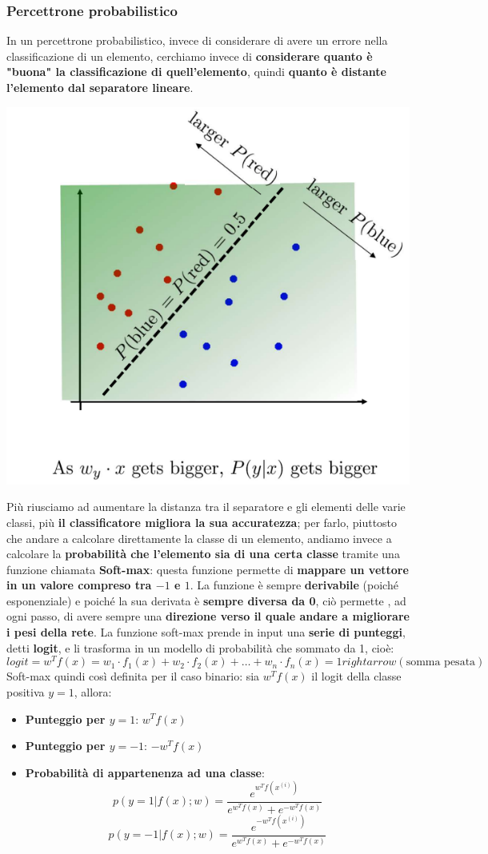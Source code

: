 \documentclass[12pt]{article}
\begin{document}
\subsubsection{Percettrone probabilistico}
In un percettrone probabilistico, invece di considerare di avere un errore nella classificazione di un elemento, cerchiamo invece di \textbf{considerare quanto è "buona" la classificazione di quell'elemento}, quindi \textbf{quanto è distante l'elemento dal separatore lineare}.
\begin{center}
    \includegraphics[width =0.50\linewidth]{Images/112.PNG}
\end{center}
Più riusciamo ad aumentare la distanza tra il separatore e gli elementi delle varie classi, più \textbf{il classificatore migliora la sua accuratezza};
per farlo, piuttosto che andare a calcolare direttamente la classe di un elemento, andiamo invece a calcolare la \textbf{probabilità che l'elemento sia di una certa classe} tramite una
funzione chiamata \textbf{Soft-max}: questa funzione permette di \textbf{mappare un vettore in un valore compreso tra $-1$ e $1$}. La funzione è sempre \textbf{derivabile} (poiché esponenziale) e poiché la sua derivata è \textbf{sempre diversa da 0}, ciò permette , ad ogni passo,
di avere sempre una \textbf{direzione verso il quale andare a migliorare i pesi della rete}. La funzione soft-max prende in input una \textbf{serie di punteggi}, detti \textbf{logit}, e li trasforma in un modello di probabilità che sommato da 1, cioè:
$$logit = w^T f(x) = w_1 \cdot f_1(x) + w_2 \cdot f_2(x) + \dots + w_n \cdot f_n(x) = 1 rightarrow (\textrm{somma pesata})$$ 
Soft-max quindi così definita per il caso binario: sia $w^T f(x)$ il logit della classe positiva $y = 1$, allora:
\begin{itemize}
    \item \textbf{Punteggio per $y = 1$}: $w^T f(x)$
    \item \textbf{Punteggio per $y = -1$}: $-w^T f(x)$
    \item \textbf{Probabilità di appartenenza ad una classe}: 
    $$p(y = 1|f(x); w) = \frac{e^{w^T f(x^{(i)})}}{e^{w^T f(x)} + e^{-w^T f(x)}}$$
    $$p(y = -1|f(x); w) = \frac{e^{-w^T f(x^{(i)})}}{e^{w^T f(x)} + e^{-w^T f(x)}}$$
\end{itemize}
\end{document}
